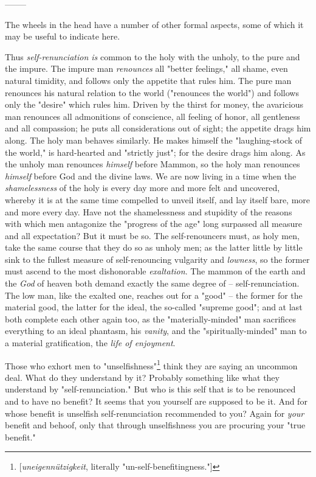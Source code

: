 \begin{center}
--------\end{center}


The wheels in the head have a number of other formal aspects, some of which it 
may be useful to indicate here.

Thus \textit{self-renunciation is} common to the holy with the unholy, to the 
pure and the impure. The impure man \textit{renounces} all "{}better 
feelings,"{} all shame, even natural timidity, and follows only the appetite 
that rules him. The pure man renounces his natural relation to the world 
("{}renounces the world"{}) and follows only the "{}desire"{} which rules him. 
Driven by the thirst for money, the avaricious man renounces all admonitions 
of conscience, all feeling of honor, all gentleness and all compassion; he 
puts all considerations out of sight; the appetite drags him along. The holy 
man behaves similarly. He makes himself the "{}laughing-stock of the world,"{} 
is hard-hearted and "{}strictly just"{}; for the desire drags him along. As 
the unholy man renounces \textit{himself} before Mammon, so the holy man 
renounces \textit{himself} before God and the divine laws. We are now living 
in a time when the \textit{shamelessness} of the holy is every day more and 
more felt and uncovered, whereby it is at the same time compelled to unveil 
itself, and lay itself bare, more and more every day. Have not the 
shamelessness and stupidity of the reasons with which men antagonize the 
"{}progress of the age"{} long surpassed all measure and all expectation? But 
it must be so. The self-renouncers must, as holy men, take the same course 
that they do so as unholy men; as the latter little by little sink to the 
fullest measure of self-renouncing vulgarity and \textit{lowness}, so the 
former must ascend to the most dishonorable \textit{exaltation}. The mammon of 
the earth and the \textit{God} of heaven both demand exactly the same degree 
of -- self-renunciation. The low man, like the exalted one, reaches out for a 
"{}good"{} -- the former for the material good, the latter for the ideal, the 
so-called "{}supreme good"{}; and at last both complete each other again too, 
as the "{}materially-minded"{} man sacrifices everything to an ideal phantasm, 
his \textit{vanity}, and the "{}spiritually-minded"{} man to a material 
gratification, the \textit{life of enjoyment}.

Those who exhort men to 
"{}unselfishness"{}\footnote{[\textit{uneigenn\"utzigkeit}, literally 
"{}un-self-benefitingness."{}]} think they are saying an uncommon deal. What 
do they understand by it? Probably something like what they understand by 
"{}self-renunciation."{} But who is this self that is to be renounced and to 
have no benefit? It seems that you yourself are supposed to be it. And for 
whose benefit is unselfish self-renunciation recommended to you? Again for 
\textit{your} benefit and behoof, only that through unselfishness you are 
procuring your "{}true benefit."{}

